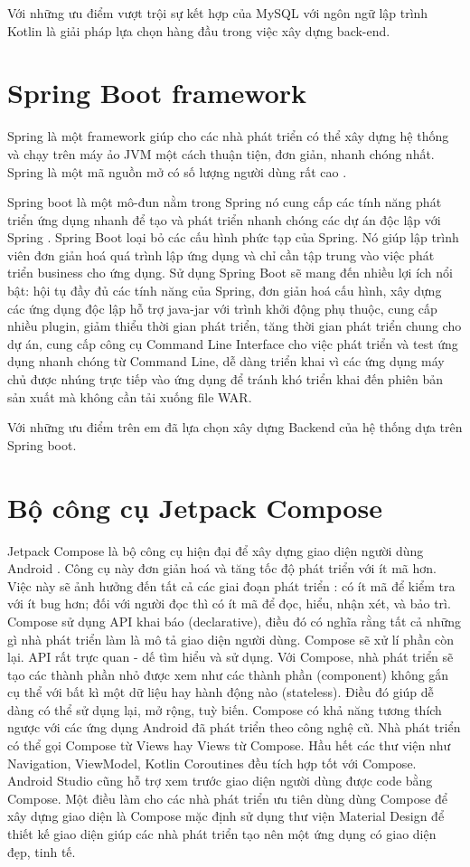 \documentclass[../Main.tex]{subfiles}
\begin{document}
Với những ưu điểm vượt trội sự kết hợp của MySQL với ngôn ngữ lập trình Kotlin là giải pháp lựa chọn hàng đầu trong việc xây dựng back-end.

\section{Spring Boot framework}
Spring là một framework giúp cho các nhà phát triển có thể xây dựng hệ thống và chạy trên máy ảo JVM một cách thuận tiện, đơn giản, nhanh chóng nhất. Spring là một mã nguồn mở có số lượng người dùng rất cao \cite{Spring}. 

Spring boot là một mô-đun nằm trong Spring nó cung cấp các tính năng phát triển ứng dụng nhanh để tạo và phát triển nhanh chóng các dự án độc lập với Spring \cite{SpringBoot}. Spring Boot loại bỏ các cấu hình phức tạp của Spring. Nó giúp lập trình viên đơn giản hoá quá trình lập ứng dụng và chỉ cần tập trung vào việc phát triển business cho ứng dụng.
Sử dụng Spring Boot sẽ mang đến nhiều lợi ích nổi bật: hội tụ đầy đủ các tính năng của Spring, đơn giản hoá cấu hình, xây dựng các ứng dụng độc lập hỗ trợ java-jar với trình khởi động phụ thuộc, cung cấp nhiều plugin, giảm thiểu thời gian phát triển, tăng thời gian phát triển chung cho dự án, cung cấp công cụ Command Line Interface cho việc phát triển và test ứng dụng nhanh chóng từ Command Line, dễ dàng triển khai vì các ứng dụng máy chủ được nhúng trực tiếp vào ứng dụng để tránh khó triển khai đến phiên bản sản xuất mà không cần tải xuống file WAR.

Với những ưu điểm trên em đã lựa chọn xây dựng Backend của hệ thống dựa trên Spring boot.
\section{Bộ công cụ Jetpack Compose}
Jetpack Compose là bộ công cụ hiện đại để xây dựng giao diện người dùng Android \cite{Compose}. Công cụ này đơn giản hoá và tăng tốc độ phát triển với ít mã hơn. Việc này sẽ ảnh hưởng đến tất cả các giai đoạn phát triển : có ít mã để kiểm tra với ít bug hơn; đối với người đọc thì có ít mã để đọc, hiểu, nhận xét, và bảo trì. Compose sử dụng API khai báo (declarative), điều đó có nghĩa rằng tất cả những gì nhà phát triển làm là mô tả giao diện người dùng. Compose sẽ xử lí phần còn lại. API rất trực quan - dế tìm hiểu và sử dụng. Với Compose, nhà phát triển sẽ tạo các thành phần nhỏ được xem như các thành phần (component) không gắn cụ thể với bất kì một dữ liệu hay hành động nào (stateless). Điều đó giúp dễ dàng có thể sử dụng lại, mở rộng, tuỳ biến. Compose có khả năng tương thích ngược với các ứng dụng Android đã phát triển theo công nghệ cũ. Nhà phát triển có thể gọi Compose từ Views hay Views từ Compose. Hầu hết các thư viện như Navigation, ViewModel, Kotlin Coroutines đều tích hợp tốt với Compose. Android Studio cũng hỗ trợ xem trước giao diện người dùng được code bằng Compose. Một điều làm cho các nhà phát triển ưu tiên dùng dùng Compose để xây dựng giao diện là Compose mặc định sử dụng thư viện Material Design để thiết kế giao diện giúp các nhà phát triển tạo nên một ứng dụng có giao diện đẹp, tinh tế.
\end{document}
